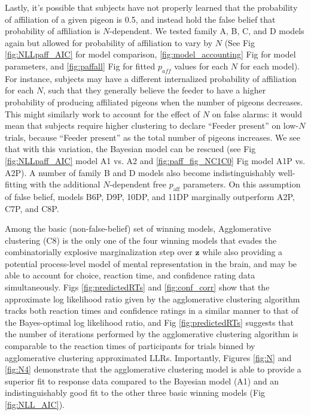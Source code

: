 \documentclass{article}
\begin{document}
Lastly, it’s possible that subjects have not properly learned that the probability of affiliation of a given pigeon is 0.5, and instead hold the false belief that probability of affiliation is $N$-dependent. We tested family A, B, C, and D models again but allowed for probability of affiliation to vary by $N$ (See Fig \ref{fig:NLLpaff_AIC} for model comparison, \ref{fig:model_accounting} Fig for model parameters, and \ref{fig:paffall} Fig for fitted $p_{aff}$ values for each $N$ for each model). For instance, subjects may have a different internalized probability of affiliation for each $N$, such that they generally believe the feeder to have a higher probability of producing affiliated pigeons when the number of pigeons decreases. This might similarly work to account for the effect of $N$ on false alarms: it would mean that subjects require higher clustering to declare ``Feeder present” on low-$N$ trials, because  ``Feeder present”  as the total number of pigeons increases. We see that with this variation, the Bayesian model can be rescued (see Fig \ref{fig:NLLpaff_AIC} model A1 vs. A2 and \ref{fig:paff_fig_NC1C0} Fig model A1P vs. A2P). A number of family B and D models also become indistinguishably well-fitting with the additional $N$-dependent free $p_\text{aff}$ parameters. On this assumption of false belief, models B6P, D9P, 10DP, and 11DP marginally outperform A2P, C7P, and C8P.

Among the basic (non-false-belief) set of winning models, Agglomerative clustering (C8) is the only one of the four winning models that evades the combinatorially explosive marginalization step over $\mathbf{z}$ while also providing a potential process-level model of mental representation in the brain, and may be able to account for choice, reaction time, and confidence rating data simultaneously. Figs \ref{fig:predictedRTs} and \ref{fig:conf_corr} show that the approximate log likelihood ratio given by the agglomerative clustering algorithm tracks both reaction times and confidence ratings in a similar manner to that of the Bayes-optimal log likelihood ratio, and Fig \ref{fig:predictedRTs} suggests that the number of iterations performed by the agglomerative clustering algorithm is comparable to the reaction times of participants for trials binned by agglomerative clustering approximated LLRs. Importantly, Figures \ref{fig:N} and \ref{fig:N4} demonstrate that the agglomerative clustering model is able to provide a superior fit to response data compared to the Bayesian model (A1) and an indistinguishably good fit to the other three basic winning models (Fig \ref{fig:NLL_AIC}). 
\end{document}
